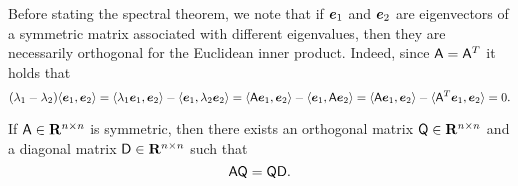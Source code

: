 Before stating the spectral theorem,
we note that if $\mathbf{\boldsymbol{e}}_1$ and $\mathbf{\boldsymbol{e}}_2$ are eigenvectors of a symmetric matrix associated with different eigenvalues,
then they are necessarily orthogonal for the Euclidean inner product.
Indeed, since $\mathsf A = \mathsf A^T$ it holds that
\[
    (\lambda_1 - \lambda_2) \langle\mathbf{\boldsymbol{e}}_1, \mathbf{\boldsymbol{e}}_2\rangle
    = \langle\lambda_1 \mathbf{\boldsymbol{e}}_1, \mathbf{\boldsymbol{e}}_2\rangle - \langle\mathbf{\boldsymbol{e}}_1, \lambda_2 \mathbf{\boldsymbol{e}}_2\rangle
    = \langle\mathsf A \mathbf{\boldsymbol{e}}_1, \mathbf{\boldsymbol{e}}_2\rangle - \langle\mathbf{\boldsymbol{e}}_1, \mathsf A \mathbf{\boldsymbol{e}}_2\rangle
    = \langle\mathsf A \mathbf{\boldsymbol{e}}_1, \mathbf{\boldsymbol{e}}_2\rangle - \langle\mathsf A^T \mathbf{\boldsymbol{e}}_1, \mathbf{\boldsymbol{e}}_2\rangle = 0.
\]
\begin{theorem}
    \label{theorem:spectral_theorem}
    If $\mathsf A \in \mathbf R^{n \times n}$ is symmetric,
    then there exists an orthogonal matrix $\mathsf Q \in \mathbf R^{n \times n}$ and a diagonal matrix $\mathsf D \in \mathbf R^{n \times n}$ such that
    \[
        \mathsf A \mathsf Q = \mathsf Q \mathsf D.
    \]
\end{theorem}
